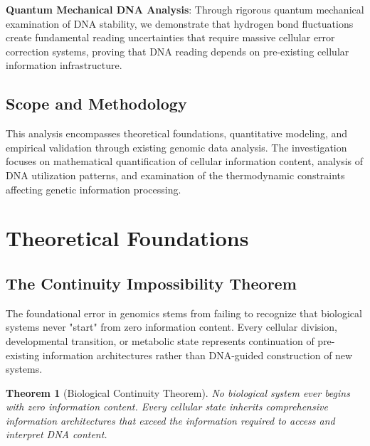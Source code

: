 \documentclass[12pt,a4paper]{article}
\newtheorem{theorem}{Theorem}[section]
\begin{document}
\textbf{Quantum Mechanical DNA Analysis}: Through rigorous quantum mechanical examination of DNA stability, we demonstrate that hydrogen bond fluctuations create fundamental reading uncertainties that require massive cellular error correction systems, proving that DNA reading depends on pre-existing cellular information infrastructure.

\subsection{Scope and Methodology}

This analysis encompasses theoretical foundations, quantitative modeling, and empirical validation through existing genomic data analysis. The investigation focuses on mathematical quantification of cellular information content, analysis of DNA utilization patterns, and examination of the thermodynamic constraints affecting genetic information processing.

\section{Theoretical Foundations}

\subsection{The Continuity Impossibility Theorem}

The foundational error in genomics stems from failing to recognize that biological systems never "start" from zero information content. Every cellular division, developmental transition, or metabolic state represents continuation of pre-existing information architectures rather than DNA-guided construction of new systems.

\begin{theorem}[Biological Continuity Theorem]
No biological system ever begins with zero information content. Every cellular state inherits comprehensive information architectures that exceed the information required to access and interpret DNA content.
\end{theorem}
\end{document}
